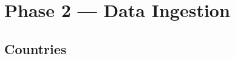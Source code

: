 \section{Phase 2 — Data Ingestion}

\subsection{Countries}


\inputminted{scala}{../../code/p2_countries.scala}

